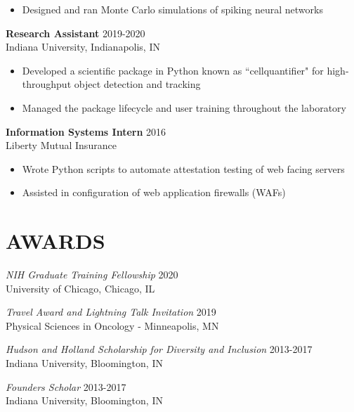 \documentclass[margin, 10pt]{res} %
\begin{document}
\begin{resume}
\begin{itemize}
\item Designed and ran Monte Carlo simulations of spiking neural networks 
 
\end{itemize}
 
\textbf{Research Assistant} \hfill 2019-2020\\
Indiana University, Indianapolis, IN
\begin{itemize} \itemsep -2pt

\item Developed a scientific package in Python known as ``cellquantifier" for high-throughput object detection and tracking
\item Managed the package lifecycle and user training throughout the laboratory

\end{itemize}

\textbf{Information Systems Intern} \hfill 2016\\
Liberty Mutual Insurance
\begin{itemize} \itemsep -2pt
\item Wrote Python scripts to automate attestation testing of web facing servers
\item Assisted in configuration of web application firewalls (WAFs)
\end{itemize} 




\section{AWARDS}

{\sl NIH Graduate Training Fellowship} \hfill 2020 \\
University of Chicago, Chicago, IL

{\sl Travel Award and Lightning Talk Invitation} \hfill 2019 \\
Physical Sciences in Oncology - Minneapolis, MN

{\sl Hudson and Holland Scholarship for Diversity and Inclusion} \hfill 2013-2017 \\
Indiana University, Bloomington, IN 

{\sl Founders Scholar} \hfill 2013-2017 \\
Indiana University, Bloomington, IN 


\end{resume}
\end{document}
